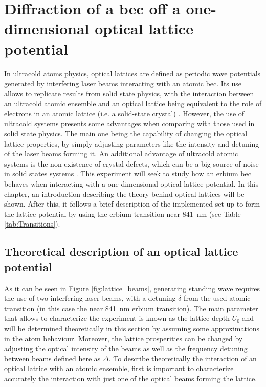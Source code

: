 
\chapter{Diffraction of a \acl{bec} off a one-dimensional optical lattice potential}
\label{chap:one_dimensional_lattices}
In ultracold atoms physics, optical lattices are defined as periodic wave potentials generated by interfering laser beams interacting with an atomic \ac{bec}. Its use allows to replicate results from solid state physics, with the interaction between an ultracold atomic ensemble and an optical lattice being equivalent to the role of electrons in an atomic lattice (i.e. a solid-state crystal) \cite{Lewenstein2007, Bloch2008,Morsch2006}.  However, the use of ultracold systems presents some advantages when comparing with those used in solid state physics. The main one being the capability of changing the optical lattice properties, by simply adjusting parameters like the intensity and detuning of the laser beams forming it. An additional advantage of ultracold atomic systems is the non-existence of crystal defects, which can be a big source of noise in solid states systems \cite{VanDerZiel1978}. This experiment will seek to study how an erbium \ac{bec} behaves when interacting with a one-dimensional optical lattice potential. In this chapter, an introduction describing the theory behind optical lattices will be shown. After this, it follows a brief description of the implemented set up to form the lattice potential by using the erbium transition near \SI{841}{\nano\meter} (see Table \ref{tab:Transitions}).


\section{Theoretical description of an optical lattice potential}

As it can be seen in Figure \ref{fig:lattice_beams}, generating standing wave requires the use of two interfering laser beams, with a detuning $\delta$ from the used atomic transition (in this case the near \SI{841}{\nano\meter} erbium transition). The main parameter that allows to characterize the experiment is known as the lattice depth $U_0$ and will be determined theoretically in this section by assuming some approximations in the atom behaviour. Moreover, the lattice prosperities can be changed by adjusting the optical intensity of the beams as well as the frequency detuning between beams defined here as $\Delta$. To describe theoretically the interaction of an optical lattice with an atomic ensemble, first is important to characterize accurately the interaction with just one of the optical beams forming the lattice.

